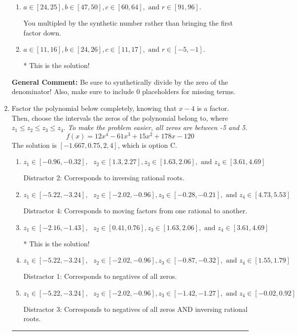 \documentclass{extbook}[14pt]
\newcommand{\litem}[1]{\item #1

\rule{\textwidth}{0.4pt}}
\begin{document}
\begin{enumerate}
{\begin{enumerate}[label=\Alph*.]
 You divided by the opposite of the factor.
\item \( a \in [24, 25], b \in [47, 50], c \in [60, 64], \text{ and } r \in [91, 96]. \)

 You multipled by the synthetic number rather than bringing the first factor down.
\item \( a \in [11, 16], b \in [24, 26], c \in [11, 17], \text{ and } r \in [-5, -1]. \)

* This is the solution!
\end{enumerate}

\textbf{General Comment:} Be sure to synthetically divide by the zero of the denominator! Also, make sure to include 0 placeholders for missing terms.
}
\litem{
Factor the polynomial below completely, knowing that $x -4$ is a factor. Then, choose the intervals the zeros of the polynomial belong to, where $z_1 \leq z_2 \leq z_3 \leq z_4$. \textit{To make the problem easier, all zeros are between -5 and 5.}
\[ f(x) = 12x^{4} -61 x^{3} +15 x^{2} +178 x -120 \]The solution is \( [-1.667, 0.75, 2, 4] \), which is option C.\begin{enumerate}[label=\Alph*.]
\item \( z_1 \in [-0.96, -0.32], \text{   }  z_2 \in [1.3, 2.27], z_3 \in [1.63, 2.06], \text{   and   } z_4 \in [3.61, 4.69] \)

 Distractor 2: Corresponds to inversing rational roots.
\item \( z_1 \in [-5.22, -3.24], \text{   }  z_2 \in [-2.02, -0.96], z_3 \in [-0.28, -0.21], \text{   and   } z_4 \in [4.73, 5.53] \)

 Distractor 4: Corresponds to moving factors from one rational to another.
\item \( z_1 \in [-2.16, -1.43], \text{   }  z_2 \in [0.41, 0.76], z_3 \in [1.63, 2.06], \text{   and   } z_4 \in [3.61, 4.69] \)

* This is the solution!
\item \( z_1 \in [-5.22, -3.24], \text{   }  z_2 \in [-2.02, -0.96], z_3 \in [-0.87, -0.32], \text{   and   } z_4 \in [1.55, 1.79] \)

 Distractor 1: Corresponds to negatives of all zeros.
\item \( z_1 \in [-5.22, -3.24], \text{   }  z_2 \in [-2.02, -0.96], z_3 \in [-1.42, -1.27], \text{   and   } z_4 \in [-0.02, 0.92] \)

 Distractor 3: Corresponds to negatives of all zeros AND inversing rational roots.
\end{enumerate}

}
\end{enumerate}
\end{document}
